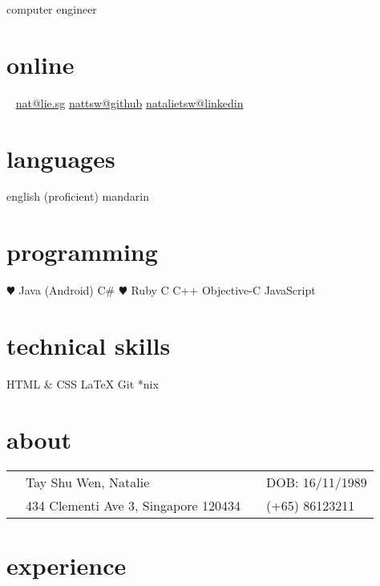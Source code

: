 \documentclass[]{friggeri-cv}
\begin{document}
{computer engineer}


\begin{aside}
	\section{online}
	\Email~ \href{mailto:nat@lie.sg}{nat@lie.sg}
	\href{http://github.com/nattsw}{nattsw@github}
	\href{http://sg.linkedin.com/in/natalietsw}{natalietsw@linkedin}
	\section{languages}
	english (proficient)
	mandarin
	\section{programming}
	{\color{red} $\varheartsuit$} Java (Android)
	C\#
	{\color{red} $\varheartsuit$} Ruby
	C
	C++
	Objective-C
	JavaScript
	\section{technical skills}
	HTML \& CSS
	\LaTeX
	Git
	*nix
\end{aside}

\section{about}

\begin{tabular}{ p{0.45cm} p{6.5cm} p{0.45cm} p{6.5cm} }
	\Female 	& Tay Shu Wen, Natalie	 & \Scorpio &  DOB: 16/11/1989\\
	\Letter & 434 Clementi Ave 3, Singapore 120434 & \Mobilefone & (+65) 86123211 \\
\end{tabular}

\section{experience}
\end{document}
